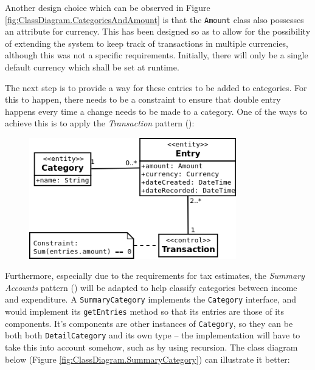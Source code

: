 Another design choice which can be observed in Figure
\ref{fig:ClassDiagram.CategoriesAndAmount} is that the \texttt{Amount} class
also possesses an attribute for currency. This has been designed so as to allow
for the possibility of extending the system to keep track of transactions in
multiple currencies, although this was not a specific requirements. Initially,
there will only be a single default currency which shall be set at runtime.

The next step is to provide a way for these entries to be added to categories.
For this to happen, there needs to be a constraint to ensure that double entry
happens every time a change needs to be made to a category. One of the ways to
achieve this is to apply the \emph{Transaction} pattern
(\cite[][Section~6.2]{fowler1997analysis}):
\begin{figure}[ht!]
  \begin{center}
    \includegraphics[width=9cm]{./contents/img/Class_Diagram_-_Transaction.png}
  \end{center}
  \caption{}
  \label{fig:ClassDiagram.Transaction}
\end{figure}
\FloatBarrier


Furthermore, especially due to the requirements for tax estimates, the
\emph{Summary Accounts} pattern (\cite[][Section~6.3]{fowler1997analysis}) will
be adapted to help classify categories between income and expenditure. A
\texttt{SummaryCategory} implements the \texttt{Category} interface, and would
implement its \texttt{getEntries} method so that its entries are those of its
components. It's components are other instances of \texttt{Category}, so they
can be both both \texttt{DetailCategory} and its own type -- the implementation
will have to take this into account somehow, such as by using recursion. The
class diagram below (Figure \ref{fig:ClassDiagram.SummaryCategory}) can
illustrate it better:

